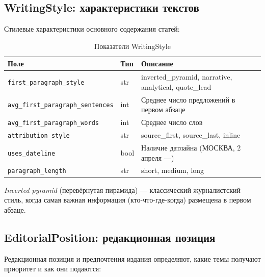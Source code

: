 
\subsection{WritingStyle: характеристики текстов}

Стилевые характеристики основного содержания статей:

\begin{table}[h!]
\centering
\caption{Показатели WritingStyle}
\label{tab:writing_style}
\footnotesize
\begin{tabular}{|l|l|l|}
\hline
\textbf{Поле} & \textbf{Тип} & \textbf{Описание} \\
\hline
\texttt{first\_paragraph\_style} & str & inverted\_pyramid, narrative, analytical, quote\_lead \\
\texttt{avg\_first\_paragraph\_sentences} & int & Среднее число предложений в первом абзаце \\
\texttt{avg\_first\_paragraph\_words} & int & Среднее число слов \\
\texttt{attribution\_style} & str & source\_first, source\_last, inline \\
\texttt{uses\_dateline} & bool & Наличие датлайна (МОСКВА, 2 апреля ---) \\
\texttt{paragraph\_length} & str & short, medium, long \\
\hline
\end{tabular}
\end{table}

\textit{Inverted pyramid} (перевёрнутая пирамида) --- классический журналистский стиль, когда самая важная информация (кто-что-где-когда) размещена в первом абзаце.


\subsection{EditorialPosition: редакционная позиция}

Редакционная позиция и предпочтения издания определяют, какие темы получают приоритет и как они подаются:

